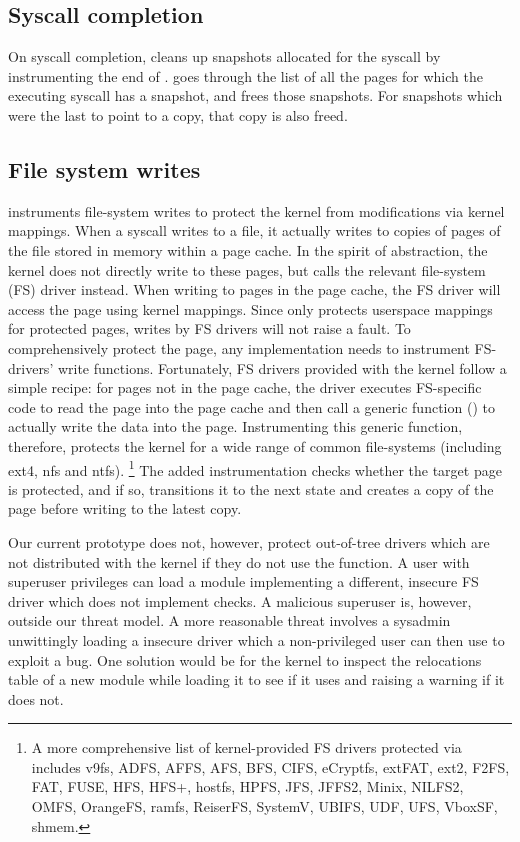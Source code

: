 \documentclass[letterpaper,twocolumn,10pt, anonymous]{article}
\begin{document}
\subsection{Syscall completion}

On syscall completion, \tiktok cleans up snapshots allocated for 
the syscall by instrumenting the end of .
\tiktok goes through the list of all the pages for which the 
executing syscall has a snapshot, and frees those snapshots.
For snapshots which were the last to point to a copy, that 
copy is also freed.


\subsection{File system writes}

\tiktok instruments file-system writes to protect the kernel
from modifications via kernel mappings.
When a  syscall writes to a file, it actually
writes to copies of pages of the file stored in memory within 
a page cache.
In the spirit of abstraction, the kernel does not directly write to 
these pages, but calls the relevant file-system (FS) driver instead.
When writing to pages in the page cache, the FS driver will access the 
page using kernel mappings.
Since \tiktok only protects userspace mappings for protected pages, 
writes by FS drivers will not raise a fault.
To comprehensively protect the page, any implementation needs to 
instrument FS-drivers' write functions.
Fortunately, FS drivers provided with the kernel follow a simple 
recipe: for pages not in the page cache, the driver executes 
FS-specific code to read the page into the page cache and then 
call a generic function () to actually 
write the data into the page.
Instrumenting this generic function, therefore, protects the kernel
for a wide range of common file-systems (including ext4, nfs and 
ntfs). \footnote{A more comprehensive list of kernel-provided FS drivers 
protected via  includes v9fs, ADFS, AFFS, 
AFS, BFS, CIFS, eCryptfs, extFAT, ext2, F2FS,  FAT, FUSE, HFS, HFS+, 
hostfs, HPFS, JFS, JFFS2, Minix, NILFS2, OMFS, OrangeFS, ramfs, ReiserFS,
SystemV, UBIFS, UDF, UFS, VboxSF, shmem.}
The added instrumentation checks whether the target page is 
protected, and if so, transitions it to the next state and 
creates a copy of the page before writing to the latest copy.

Our current prototype does not, however, protect out-of-tree drivers
which are not distributed with the kernel if they do not use the 
 function.
A user with superuser privileges can load a module implementing a 
different, insecure FS driver which does not implement \tiktok checks.
A malicious superuser is, however, outside our threat model.
A more reasonable threat involves a sysadmin unwittingly loading a 
insecure driver which a non-privileged user can then use to 
exploit a \tocttou bug. 
One solution would be for the kernel to inspect the relocations table of 
a new module while loading it to see if it uses 
and raising a warning if it does not.
\end{document}
